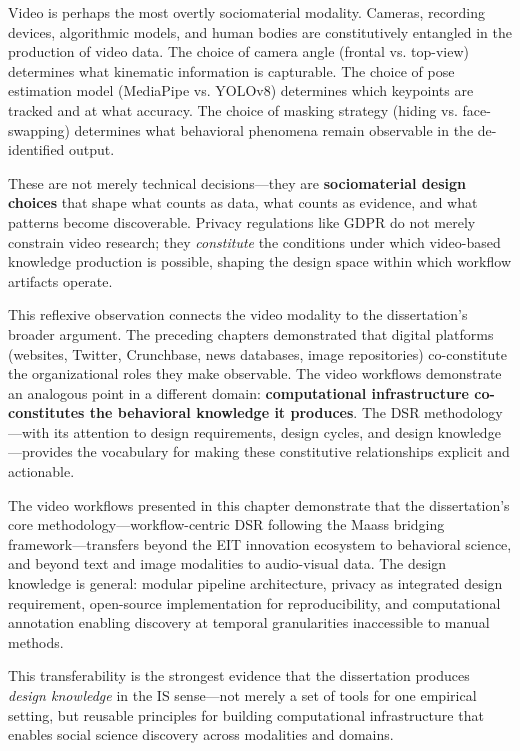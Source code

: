 \documentclass[../main.tex]{subfiles}
\begin{document}
Video is perhaps the most overtly sociomaterial modality. Cameras, recording devices, algorithmic models, and human bodies are constitutively entangled in the production of video data. The choice of camera angle (frontal vs. top-view) determines what kinematic information is capturable. The choice of pose estimation model (MediaPipe vs. YOLOv8) determines which keypoints are tracked and at what accuracy. The choice of masking strategy (hiding vs. face-swapping) determines what behavioral phenomena remain observable in the de-identified output.

These are not merely technical decisions---they are \textbf{sociomaterial design choices} that shape what counts as data, what counts as evidence, and what patterns become discoverable. Privacy regulations like GDPR do not merely constrain video research; they \textit{constitute} the conditions under which video-based knowledge production is possible, shaping the design space within which workflow artifacts operate.

This reflexive observation connects the video modality to the dissertation's broader argument. The preceding chapters demonstrated that digital platforms (websites, Twitter, Crunchbase, news databases, image repositories) co-constitute the organizational roles they make observable. The video workflows demonstrate an analogous point in a different domain: \textbf{computational infrastructure co-constitutes the behavioral knowledge it produces}. The DSR methodology---with its attention to design requirements, design cycles, and design knowledge---provides the vocabulary for making these constitutive relationships explicit and actionable.

\begin{insightbox}[Transferability]
The video workflows presented in this chapter demonstrate that the dissertation's core methodology---workflow-centric DSR following the Maass bridging framework---transfers beyond the EIT innovation ecosystem to behavioral science, and beyond text and image modalities to audio-visual data. The design knowledge is general: modular pipeline architecture, privacy as integrated design requirement, open-source implementation for reproducibility, and computational annotation enabling discovery at temporal granularities inaccessible to manual methods.
\end{insightbox}

This transferability is the strongest evidence that the dissertation produces \textit{design knowledge} in the IS sense---not merely a set of tools for one empirical setting, but reusable principles for building computational infrastructure that enables social science discovery across modalities and domains.
\end{document}
